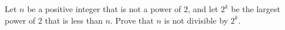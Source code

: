 Let $n$ be a positive integer that is not a power of $2$, and let $2^k$ be the largest power of $2$ that is less than $n$. Prove that $n$ is not divisible by $2^k$.
